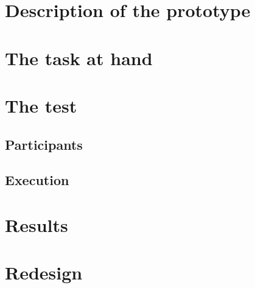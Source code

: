\documentclass{article}
\begin{document}


\section{Description of the prototype}

\section{The task at hand}

\section{The test}
\subsection{Participants}

\subsection{Execution}

\section{Results}

\section{Redesign}
\end{document}
